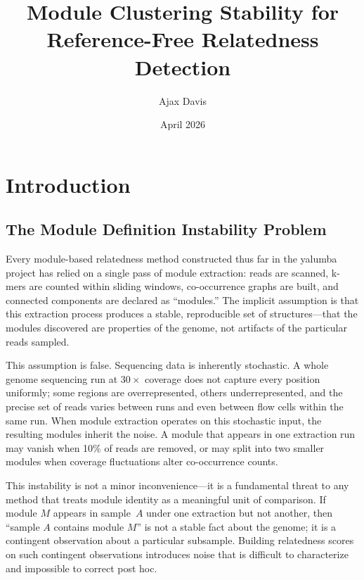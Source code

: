 \documentclass{../yalumba}
\title{Module Clustering Stability for\\Reference-Free Relatedness Detection}
\author{Ajax Davis}
\date{April 2026}
\begin{document}
\maketitle

\tableofcontents
\newpage

\section{Introduction}
\label{sec:intro}


\subsection{The Module Definition Instability Problem}

Every module-based relatedness method constructed thus far in the yalumba
project has relied on a single pass of module extraction: reads are scanned,
k-mers are counted within sliding windows, co-occurrence graphs are built, and
connected components are declared as ``modules.''  The implicit assumption is
that this extraction process produces a stable, reproducible set of
structures---that the modules discovered are properties of the genome, not
artifacts of the particular reads sampled.


This assumption is false.  Sequencing data is inherently stochastic.  A whole
genome sequencing run at $30\times$ coverage does not capture every position
uniformly; some regions are overrepresented, others underrepresented, and the
precise set of reads varies between runs and even between flow cells within the
same run.  When module extraction operates on this stochastic input, the
resulting modules inherit the noise.  A module that appears in one extraction
run may vanish when 10\% of reads are removed, or may split into two smaller
modules when coverage fluctuations alter co-occurrence counts.

This instability is not a minor inconvenience---it is a fundamental threat to
any method that treats module identity as a meaningful unit of comparison.  If
module $M$ appears in sample~$A$ under one extraction but not another, then
``sample $A$ contains module $M$'' is not a stable fact about the genome; it is
a contingent observation about a particular subsample.  Building relatedness
scores on such contingent observations introduces noise that is difficult to
characterize and impossible to correct post hoc.
\end{document}

